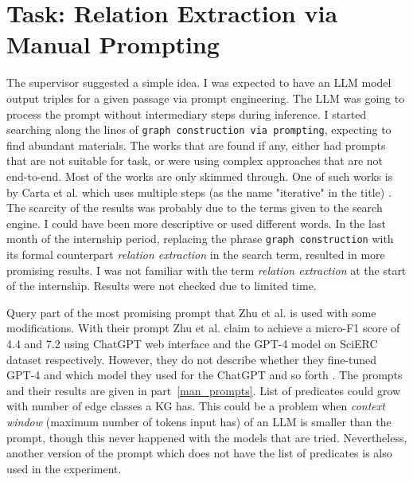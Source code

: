 \documentclass{article}
\begin{document}
\section{Task: Relation Extraction via Manual Prompting}\label{relx_manual_prompt}
The supervisor suggested a simple idea. I was expected to have an LLM model output triples for a given passage via prompt engineering. The LLM was going to process the prompt without intermediary steps during inference. I started searching along the lines of \texttt{graph construction via prompting}, expecting to find abundant materials. The works that are found if any, either had prompts that are not suitable for task, or were using complex approaches that are not end-to-end. Most of the works are only skimmed through. One of such works is by Carta et al. which uses multiple steps (as the name "iterative" in the title) \cite{carta_iterative_2023}. The scarcity of the results was probably due to the terms given to the search engine. I could have been more descriptive or used different words. In the last month of the internship period, replacing the phrase \texttt{graph construction} with its formal counterpart \textit{relation extraction} in the search term, resulted in more promising results. I was not familiar with the term \textit{relation extraction} at the start of the internship. Results were not checked due to limited time. 

Query part of the most promising prompt that Zhu et al. is used with some modifications. With their prompt Zhu et al. claim to achieve a micro-F1 score of 4.4 and 7.2 using ChatGPT web interface and the GPT-4 model on SciERC dataset respectively. However, they do not describe whether they fine-tuned GPT-4 and which model they used for the ChatGPT and so forth \cite{zhu_llms_2024}. The prompts and their results are given in part~\ref{man_prompts}. List of predicates could grow with number of edge classes a KG has. This could be a problem when \textit{context window} (maximum number of tokens input has) of an LLM is smaller than the prompt, though this never happened with the models that are tried. Nevertheless, another version of the prompt which does not have the list of predicates is also used in the experiment. 
\end{document}
